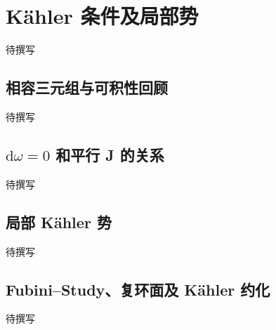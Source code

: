 
% 
% 

\section{Kähler 条件及局部势}
\label{g4:sec:1701}

待撰写

\subsection{相容三元组与可积性回顾}
\label{g4:subsec:1701:01}
待撰写

\subsection{\texorpdfstring{\(\mathrm{d}\omega=0\) 和平行 J 的关系}{d\GeometryPdfSmallOmega{}=0 和平行 J 的关系}}
\label{g4:subsec:1701:02}
待撰写

\subsection{局部 Kähler 势}
\label{g4:subsec:1701:03}
待撰写

\subsection{Fubini–Study、复环面及 Kähler 约化}
\label{g4:subsec:1701:04}
待撰写
